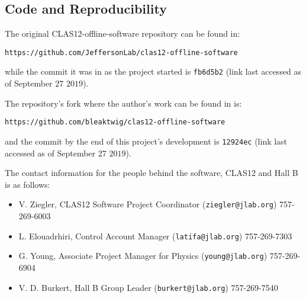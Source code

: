 \subsection{Code and Reproducibility} \label{add:code_and_reproducibility}
The original CLAS12-offline-software repository can be found in:

\texttt{https://github.com/JeffersonLab/clas12-offline-software}

while the commit it was in as the project started is \texttt{fb6d5b2} (link last accessed as of September $27$ $2019$).

\newpage

The repository's fork where the author's work can be found in is:

\texttt{https://github.com/bleaktwig/clas12-offline-software}

and the commit by the end of this project's development is \texttt{12924ec} (link last accessed as of September $27$ $2019$).

The contact information for the people behind the software, CLAS12 and Hall B is as follows:

    \begin{itemize}
        \item V. Ziegler, CLAS12 Software Project Coordinator (\texttt{ziegler@jlab.org}) 757-269-6003
        
        \item L. Elouadrhiri, Control Account Manager (\texttt{latifa@jlab.org}) 757-269-7303
        
        \item G. Young, Associate Project Manager for Physics (\texttt{young@jlab.org}) 757-269-6904
        
        \item V. D. Burkert, Hall B Group Leader (\texttt{burkert@jlab.org}) 757-269-7540
    \end{itemize}

